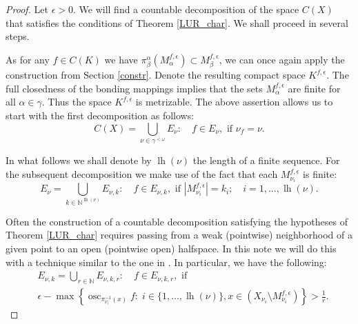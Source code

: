\documentclass[10pt,a4paper]{amsart}
\newcommand{\N}{\mathbb{N}}
\newcommand{\abs}[1]{\left\lvert#1\right\rvert}
\DeclareMathOperator{\osc}{osc}
\DeclareMathOperator{\lgth}{lh}
\begin{document}
\begin{proof}
	Let $\epsilon > 0$. We will find a countable decomposition of the space $C(X)$ that satisfies the conditions of Theorem \ref{LUR_char}. We shall proceed in several steps.
	
	As for any $f \in C(K)$ we have $\pi^\alpha_\beta\left(M^{f,\epsilon}_\alpha\right) \subset M^{f,\epsilon}_\beta$, we can once again apply the construction from Section \ref{constr}. Denote the resulting compact space $K^{f, \epsilon}$. The full closedness of the bonding mappings implies that the sets $M^{f,\epsilon}_\alpha$ are finite for all $\alpha \in \gamma$. Thus the space $K^{f,\epsilon}$ is metrizable. The above assertion allows us to start with the first decomposition as follows:
	\begin{equation} \label{dec1}
		C(X) = \bigcup_{\nu \in \gamma^{<\omega}} E_\nu: \quad f \in E_\nu, \text{ if } \nu_f = \nu.
	\end{equation}
	
	In what follows we shall denote by $\lgth(\nu)$ the length of a finite sequence. For the subsequent decomposition we make use of the fact that each $M^{f, \epsilon}_{\nu_i}$ is finite:
	\begin{equation} \label{dec2}
		E_\nu = \bigcup_{k \in \N^{\lgth(\nu)}} E_{\nu,k}: \quad f \in E_{\nu,k}, \text{ if } \abs{M^{f,\epsilon}_{\nu_i}} = k_i; \quad i = 1, \dots, \lgth(\nu). 
	\end{equation}
	
	Often the construction of a countable decomposition satisfying the hypotheses of Theorem \ref{LUR_char} requires passing from a weak (pointwise) neighborhood of a given point to an open (pointwise open) halfspace. In this note we will do this with a technique similar to the one in \cite[Lemma 4.22]{motv}. In particular, we have the following:
	\begin{equation}
		\begin{aligned}\label{dec3}
			&E_{\nu, k} = \bigcup_{r \in \N} E_{\nu, k, r}: \quad f \in E_{\nu, k, r}, \text{ if }\\
			&\epsilon - \max\left\{\osc_{\pi_{\nu_i}^{-1}(x)} f: \;  i \in \{1, \dots, \lgth(\nu)\}, x \in \left(X_{\nu_i} \setminus M^{f, \epsilon}_{\nu_i}\right)\right\}> \frac{1}{r}.
		\end{aligned}
	\end{equation}
	

\end{proof}
\end{document}
